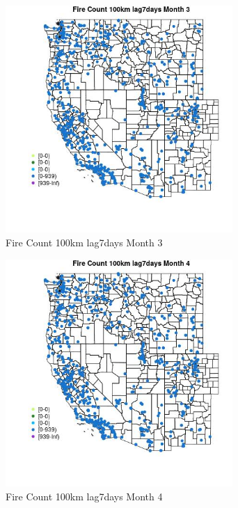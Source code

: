 \begin{figure} 
\centering  
\includegraphics[width=0.77\textwidth]{Code_Outputs/Report_ML_input_PM25_Step4_part_e_de_duplicated_aves_compiled_2019-05-21wNAs_MapObsMo3Fire_Count_100km_lag7days.jpg} 
\caption{\label{fig:Report_ML_input_PM25_Step4_part_e_de_duplicated_aves_compiled_2019-05-21wNAsMapObsMo3Fire_Count_100km_lag7days}Fire Count 100km lag7days Month 3} 
\end{figure} 
 

\begin{figure} 
\centering  
\includegraphics[width=0.77\textwidth]{Code_Outputs/Report_ML_input_PM25_Step4_part_e_de_duplicated_aves_compiled_2019-05-21wNAs_MapObsMo4Fire_Count_100km_lag7days.jpg} 
\caption{\label{fig:Report_ML_input_PM25_Step4_part_e_de_duplicated_aves_compiled_2019-05-21wNAsMapObsMo4Fire_Count_100km_lag7days}Fire Count 100km lag7days Month 4} 
\end{figure} 
 


